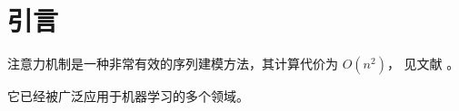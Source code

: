 \documentclass{ctexart}
\begin{document}
\section{引言}\label{sec:intro}

注意力机制是一种非常有效的序列建模方法，其计算代价为 $O(n^2)$，
见文献 \citep{vaswani2017attention}。

它已经被广泛应用于机器学习的多个领域。
\end{document}
